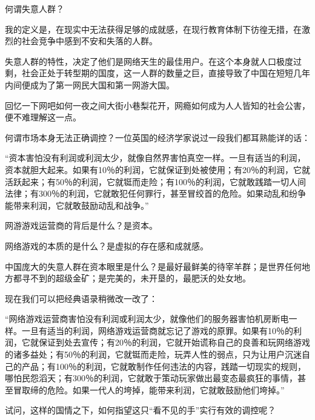 \documentclass{article}
\begin{document}
何谓失意人群？



我的定义是，在现实中无法获得足够的成就感，在现行教育体制下彷徨无措，在激烈的社会竞争中感到不安和失落的人群。



失意人群的特性，决定了他们是网络天生的最佳用户。在这个本身就人口极度过剩，社会正处于转型期的国度，这一人群的数量之巨，直接导致了中国在短短几年内间便成为了第一网民大国和第一网游大国。



回忆一下网吧如何一夜之间大街小巷梨花开，网瘾如何成为人人皆知的社会公害，便不难理解这一点。



何谓市场本身无法正确调控？一位英国的经济学家说过一段我们都耳熟能详的话：



“资本害怕没有利润或利润太少，就像自然界害怕真空一样。一旦有适当的利润，资本就胆大起来。如果有10％的利润，它就保证到处被使用；有20％的利润，它就活跃起来；有50％的利润，它就铤而走险；有100％的利润，它就敢践踏一切人间法律；有300％的利润，它就敢犯任何罪行，甚至冒绞首的危险。如果动乱和纷争能带来利润，它就敢鼓励动乱和战争。”



网游游戏运营商的背后是什么？是资本。



网络游戏的本质的是什么？是虚拟的存在感和成就感。



中国庞大的失意人群在资本眼里是什么？是最好最鲜美的待宰羊群；是世界任何地方都寻不到的超级金矿；是完美的，未开垦的，最肥沃的处女地。



现在我们可以把经典语录稍微改一改了：



“网络游戏运营商害怕没有利润或利润太少，就像他们的服务器害怕机房断电一样。一旦有适当的利润，网络游戏运营商就忘记了游戏的原罪。如果有10％的利润，它就保证到处去宣传；有20％的利润，它就开始谎称自己的良善和玩网络游戏的诸多益处；有50％的利润，它就铤而走险，玩弄人性的弱点，只为让用户沉迷自己的产品；有100％的利润，它就敢制作任何违法的内容，践踏一切现实的规则，哪怕民怨滔天；有300％的利润，它就敢于策动玩家做出最变态最疯狂的事情，甚至冒取缔的危险。如果一代人的垮掉，能带来利润，它就敢鼓励他们垮掉。”



试问，这样的国情之下，如何指望这只“看不见的手”实行有效的调控呢？
\end{document}

